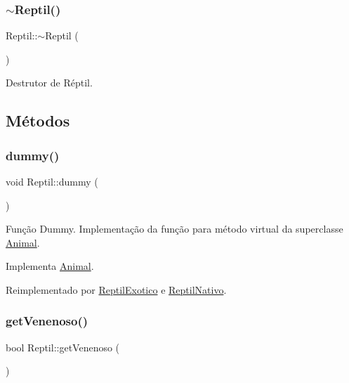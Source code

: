 \subsubsection{\texorpdfstring{$\sim$\+Reptil()}{~Reptil()}}
{\footnotesize\ttfamily Reptil\+::$\sim$\+Reptil (\begin{DoxyParamCaption}{ }\end{DoxyParamCaption})}

Destrutor de Réptil. 

\subsection{Métodos}
\mbox{\label{classReptil_acfbb0461fc05ec7b08332dd4cee122c6}} 
\subsubsection{\texorpdfstring{dummy()}{dummy()}}
{\footnotesize\ttfamily void Reptil\+::dummy (\begin{DoxyParamCaption}{ }\end{DoxyParamCaption})\hspace{0.3cm}{\ttfamily [virtual]}}

Função Dummy. Implementação da função para método virtual da superclasse \hyperlink{classAnimal}{Animal}. 

Implementa \hyperlink{classAnimal_a88fa81bb01530eaa71656b678bf05b5b}{Animal}.



Reimplementado por \hyperlink{classReptilExotico_aa59602e743a05deba4f1ff2fa453607a}{Reptil\+Exotico} e \hyperlink{classReptilNativo_a72582fd1adb5d8d562354ab35e574b3b}{Reptil\+Nativo}.

\mbox{\label{classReptil_a75138aaa91420a9f82ddd39c19ea8b78}} 
\subsubsection{\texorpdfstring{get\+Venenoso()}{getVenenoso()}}
{\footnotesize\ttfamily bool Reptil\+::get\+Venenoso (\begin{DoxyParamCaption}{ }\end{DoxyParamCaption})}

